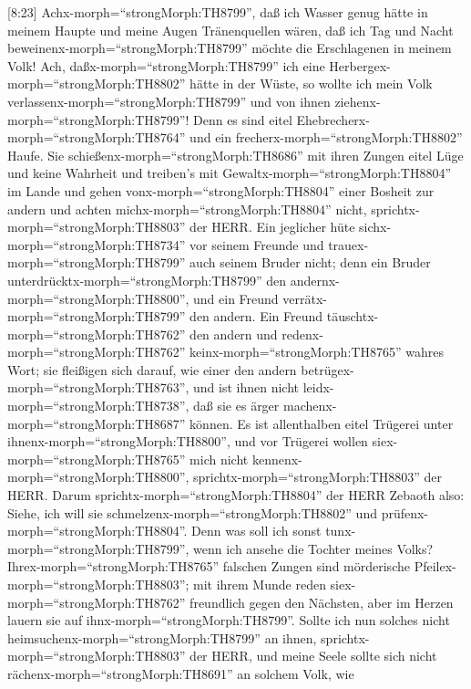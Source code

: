  {[}8:23{]} Achx-morph=``strongMorph:TH8799'', daß ich
Wasser genug hätte in meinem Haupte und meine Augen Tränenquellen wären,
daß ich Tag und Nacht beweinenx-morph=``strongMorph:TH8799'' möchte die
Erschlagenen in meinem Volk!  Ach,
daßx-morph=``strongMorph:TH8799'' ich eine
Herbergex-morph=``strongMorph:TH8802'' hätte in der Wüste, so wollte ich
mein Volk verlassenx-morph=``strongMorph:TH8799'' und von ihnen
ziehenx-morph=``strongMorph:TH8799''! Denn es sind eitel
Ehebrecherx-morph=``strongMorph:TH8764'' und ein
frecherx-morph=``strongMorph:TH8802'' Haufe.  Sie
schießenx-morph=``strongMorph:TH8686'' mit ihren Zungen eitel Lüge und
keine Wahrheit und treiben's mit Gewaltx-morph=``strongMorph:TH8804'' im
Lande und gehen vonx-morph=``strongMorph:TH8804'' einer Bosheit zur
andern und achten michx-morph=``strongMorph:TH8804'' nicht,
sprichtx-morph=``strongMorph:TH8803'' der HERR.  Ein
jeglicher hüte sichx-morph=``strongMorph:TH8734'' vor seinem Freunde und
trauex-morph=``strongMorph:TH8799'' auch seinem Bruder nicht; denn ein
Bruder unterdrücktx-morph=``strongMorph:TH8799'' den
andernx-morph=``strongMorph:TH8800'', und ein Freund
verrätx-morph=``strongMorph:TH8799'' den andern.  Ein Freund
täuschtx-morph=``strongMorph:TH8762'' den andern und
redenx-morph=``strongMorph:TH8762'' keinx-morph=``strongMorph:TH8765''
wahres Wort; sie fleißigen sich darauf, wie einer den andern
betrügex-morph=``strongMorph:TH8763'', und ist ihnen nicht
leidx-morph=``strongMorph:TH8738'', daß sie es ärger
machenx-morph=``strongMorph:TH8687'' können.  Es ist
allenthalben eitel Trügerei unter ihnenx-morph=``strongMorph:TH8800'',
und vor Trügerei wollen siex-morph=``strongMorph:TH8765'' mich nicht
kennenx-morph=``strongMorph:TH8800'',
sprichtx-morph=``strongMorph:TH8803'' der HERR.  Darum
sprichtx-morph=``strongMorph:TH8804'' der HERR Zebaoth also: Siehe, ich
will sie schmelzenx-morph=``strongMorph:TH8802'' und
prüfenx-morph=``strongMorph:TH8804''. Denn was soll ich sonst
tunx-morph=``strongMorph:TH8799'', wenn ich ansehe die Tochter meines
Volks?  Ihrex-morph=``strongMorph:TH8765'' falschen Zungen
sind mörderische Pfeilex-morph=``strongMorph:TH8803''; mit ihrem Munde
reden siex-morph=``strongMorph:TH8762'' freundlich gegen den Nächsten,
aber im Herzen lauern sie auf ihnx-morph=``strongMorph:TH8799''.
 Sollte ich nun solches nicht
heimsuchenx-morph=``strongMorph:TH8799'' an ihnen,
sprichtx-morph=``strongMorph:TH8803'' der HERR, und meine Seele sollte
sich nicht rächenx-morph=``strongMorph:TH8691'' an solchem Volk, wie

